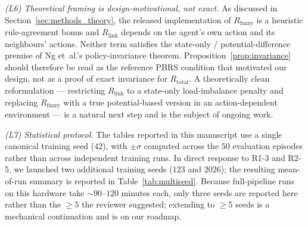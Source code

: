 \documentclass[ai,article,submit,moreauthors,pdftex]{Definitions/mdpi}
\newcommand{\rev}[1]{#1}
\begin{document}
\rev{\emph{(L6) Theoretical framing is design-motivational, not exact.} As discussed in Section~\ref{sec:methods_theory}, the released implementation of $R_{\text{fuzzy}}$ is a heuristic rule-agreement bonus and $R_{\text{link}}$ depends on the agent's own action and its neighbours' actions. Neither term satisfies the state-only / potential-difference premise of Ng et~al.'s policy-invariance theorem. Proposition~\ref{prop:invariance} should therefore be read as the reference PBRS condition that motivated our design, not as a proof of exact invariance for $R_{\text{total}}$. A theoretically clean reformulation --- restricting $R_{\text{link}}$ to a state-only load-imbalance penalty and replacing $R_{\text{fuzzy}}$ with a true potential-based version in an action-dependent environment --- is a natural next step and is the subject of ongoing work.}

\rev{\emph{(L7) Statistical protocol.} The tables reported in this manuscript use a single canonical training seed ($42$), with $\pm\sigma$ computed across the $50$ evaluation episodes rather than across independent training runs. In direct response to R1-3 and R2-5, we launched two additional training seeds ($123$ and $2026$); the resulting mean-of-run summary is reported in Table~\ref{tab:multiseed}. Because full-pipeline runs on this hardware take $\sim 90$--$120$ minutes each, only three seeds are reported here rather than the $\geq 5$ the reviewer suggested; extending to $\geq 5$ seeds is a mechanical continuation and is on our roadmap.}
\end{document}
